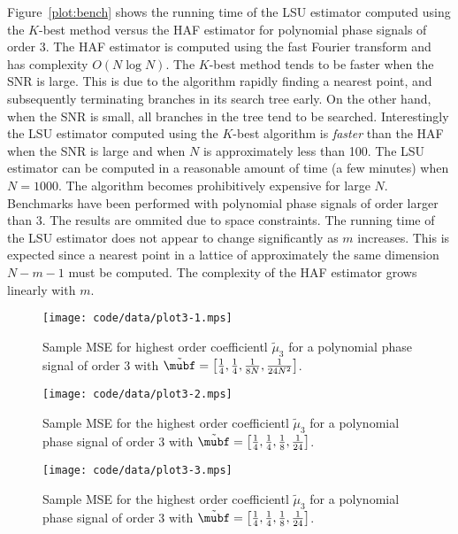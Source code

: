 \documentclass[journal]{IEEEtran}
\begin{document}
Figure~\ref{plot:bench} shows the running time of the LSU estimator computed using the $K$-best method versus the HAF estimator for polynomial phase signals of order 3.  The HAF estimator is computed using the fast Fourier transform and has complexity $O(N \log N)$.   The $K$-best method tends to be faster when the SNR is large.  This is due to the algorithm rapidly finding a nearest point, and subsequently terminating branches in its search tree early.  On the other hand, when the SNR is small, all branches in the tree tend to be searched.  Interestingly the LSU estimator computed using the $K$-best algorithm is \emph{faster} than the HAF when the SNR is large and when $N$ is approximately less than 100.  The LSU estimator can be computed in a reasonable amount of time (a few minutes) when $N=1000$.  The algorithm becomes prohibitively expensive for large $N$.  Benchmarks have been performed with polynomial phase signals of order larger than $3$.  The results are ommited due to space constraints.  The running time of the LSU estimator does not appear to change significantly as $m$ increases.  This is expected since a nearest point in a lattice of approximately the same dimension $N-m-1$ must be computed.  The complexity of the HAF estimator grows linearly with $m$.

\begin{figure}[p] 
   	\centering 
  		\texttt{[image: code/data/plot3-1.mps]} 
  		\caption{Sample MSE for highest order coefficientl $\tilde{\mu}_3$ for a polynomial phase signal of order 3 with $\tilde{\mubf} = \left[ \tfrac{1}{4}, \tfrac{1}{4}, \tfrac{1}{8N}, \tfrac{1}{24N^2}  \right]$.} 
  		\label{plot:m3small} 
 \end{figure} 

\begin{figure}[p] 
   	\centering 
  		\texttt{[image: code/data/plot3-2.mps]} 
  		\caption{Sample MSE for the highest order coefficientl $\tilde{\mu}_3$ for a polynomial phase signal of order 3 with $\tilde{\mubf} = \left[ \tfrac{1}{4}, \tfrac{1}{4}, \tfrac{1}{8}, \tfrac{1}{24}  \right]$.} 
  		\label{plot:m3big} 
 \end{figure} 

\begin{figure}[p] 
   	\centering 
  		\texttt{[image: code/data/plot3-3.mps]} 
  		\caption{Sample MSE for the highest order coefficientl $\tilde{\mu}_3$ for a polynomial phase signal of order 3 with $\tilde{\mubf} = \left[ \tfrac{1}{4}, \tfrac{1}{4}, \tfrac{1}{8}, \tfrac{1}{24}  \right]$.} 
  		\label{plot:m3bigzw} 
 \end{figure} 
\end{document}
